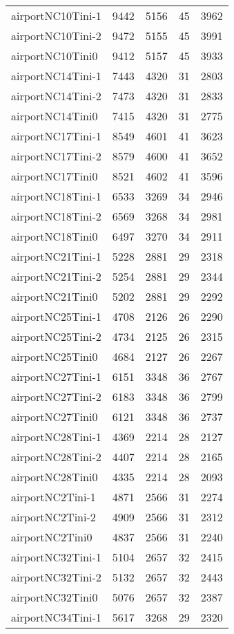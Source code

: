 \begin{longtable}{lrrrr}
airportNC10Tini-1 & 9442 & 5156 & 45 & 3962 \\
airportNC10Tini-2 & 9472 & 5155 & 45 & 3991 \\
airportNC10Tini0 & 9412 & 5157 & 45 & 3933 \\
airportNC14Tini-1 & 7443 & 4320 & 31 & 2803 \\
airportNC14Tini-2 & 7473 & 4320 & 31 & 2833 \\
airportNC14Tini0 & 7415 & 4320 & 31 & 2775 \\
airportNC17Tini-1 & 8549 & 4601 & 41 & 3623 \\
airportNC17Tini-2 & 8579 & 4600 & 41 & 3652 \\
airportNC17Tini0 & 8521 & 4602 & 41 & 3596 \\
airportNC18Tini-1 & 6533 & 3269 & 34 & 2946 \\
airportNC18Tini-2 & 6569 & 3268 & 34 & 2981 \\
airportNC18Tini0 & 6497 & 3270 & 34 & 2911 \\
airportNC21Tini-1 & 5228 & 2881 & 29 & 2318 \\
airportNC21Tini-2 & 5254 & 2881 & 29 & 2344 \\
airportNC21Tini0 & 5202 & 2881 & 29 & 2292 \\
airportNC25Tini-1 & 4708 & 2126 & 26 & 2290 \\
airportNC25Tini-2 & 4734 & 2125 & 26 & 2315 \\
airportNC25Tini0 & 4684 & 2127 & 26 & 2267 \\
airportNC27Tini-1 & 6151 & 3348 & 36 & 2767 \\
airportNC27Tini-2 & 6183 & 3348 & 36 & 2799 \\
airportNC27Tini0 & 6121 & 3348 & 36 & 2737 \\
airportNC28Tini-1 & 4369 & 2214 & 28 & 2127 \\
airportNC28Tini-2 & 4407 & 2214 & 28 & 2165 \\
airportNC28Tini0 & 4335 & 2214 & 28 & 2093 \\
airportNC2Tini-1 & 4871 & 2566 & 31 & 2274 \\
airportNC2Tini-2 & 4909 & 2566 & 31 & 2312 \\
airportNC2Tini0 & 4837 & 2566 & 31 & 2240 \\
airportNC32Tini-1 & 5104 & 2657 & 32 & 2415 \\
airportNC32Tini-2 & 5132 & 2657 & 32 & 2443 \\
airportNC32Tini0 & 5076 & 2657 & 32 & 2387 \\
airportNC34Tini-1 & 5617 & 3268 & 29 & 2320 \\

\end{longtable}
